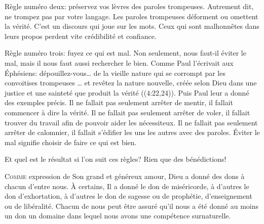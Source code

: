 Règle numéro deux: préservez vos lèvres des paroles trompeuses.
 Autrement dit, ne trompez pas par votre langage. Les paroles trompeuses
 déforment ou omettent la vérité. C'est un discours qui joue sur les mots.
 Ceux qui sont malhonnêtes dans leurs propos perdent vite
 crédibilité et confiance.


Règle numéro trois: fuyez ce qui est mal.
 Non seulement, nous faut-il éviter le mal, mais il nous faut aussi rechercher
 le bien. Comme Paul l'écrivait aux Éphésiens: 
 \Og dépouillez-vous\dots{} de la vieille nature qui se corrompt
 par les convoitises trompeuses 
 \dots{} et revêtez la nature nouvelle, créée selon Dieu dans une justice
 et une sainteté que produit la vérité \Fg{} 
 ((4:22,24)).
 Puis Paul leur a donné des exemples précis.
 Il ne fallait pas seulement arrêter de mentir,
 il fallait commencer à dire la vérité. Il ne fallait pas seulement arrêter
 de voler, il fallait trouver du travail afin de pouvoir aider les nécessiteux.
 Il ne fallait pas seulement arrêter de calomnier, il fallait s'édifier
 les uns les autres avec des paroles. Éviter le mal signifie choisir
 de faire ce qui est bien.

Et quel est le résultat si l'on suit ces règles? Rien que des bénédictions!

\dvrule






\lettrine{C}{omme} expression de Son grand et généreux amour,
 Dieu a donné des dons à chacun d'entre nous.
 À certains, Il a donné le don de miséricorde, à d'autres le don d'exhortation,
 à d'autres le don de sagesse ou de prophétie, d'enseignement ou de libéralité.
 Chacun de nous peut être assuré qu'il nous a été donné au moins un don
 \ocadr un domaine dans lequel nous avons une compétence surnaturelle.

